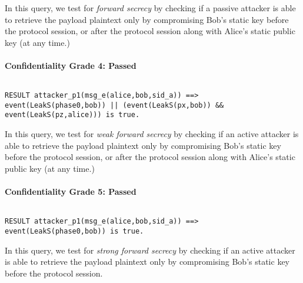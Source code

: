 In this query, we test for \emph{forward secrecy} by checking if a passive attacker is able to retrieve the payload plaintext only by compromising Bob's static key before the protocol session, or after the protocol session along with Alice's static public key (at any time.)


\paragraph{Confidentiality Grade 4: Passed}$ $
\begin{lstlisting}
RESULT attacker_p1(msg_e(alice,bob,sid_a)) ==> event(LeakS(phase0,bob)) || (event(LeakS(px,bob)) && event(LeakS(pz,alice))) is true.
\end{lstlisting}

In this query, we test for \emph{weak forward secrecy} by checking if an active attacker is able to retrieve the payload plaintext only by compromising Bob's static key before the protocol session, or after the protocol session along with Alice's static public key (at any time.)


\paragraph{Confidentiality Grade 5: Passed}$ $
\begin{lstlisting}
RESULT attacker_p1(msg_e(alice,bob,sid_a)) ==> event(LeakS(phase0,bob)) is true.
\end{lstlisting}

In this query, we test for \emph{strong forward secrecy} by checking if an active attacker is able to retrieve the payload plaintext only by compromising Bob's static key before the protocol session.


